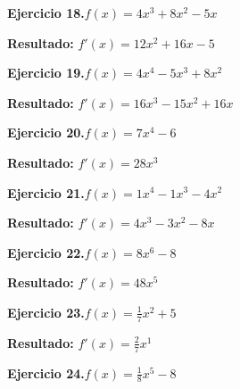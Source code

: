 \documentclass[10pt,a4paper]{article}
\begin{document}
\begin{ejbox}
\textbf{Ejercicio 18.}\quad $f(x) = 4x^3 +8x^2 -5x$
\end{ejbox}

\begin{solbox}
\textbf{Resultado:} \(\displaystyle f'(x) = 12x^2 +16x -5\)
\end{solbox}

\newpage
\begin{ejbox}
\textbf{Ejercicio 19.}\quad $f(x) = 4x^4 -5x^3 +8x^2$
\end{ejbox}

\begin{solbox}
\textbf{Resultado:} \(\displaystyle f'(x) = 16x^3 -15x^2 +16x\)
\end{solbox}

\begin{ejbox}
\textbf{Ejercicio 20.}\quad $f(x) = 7x^{4} -6$
\end{ejbox}

\begin{solbox}
\textbf{Resultado:} \(\displaystyle f'(x) = 28x^{3}\)
\end{solbox}

\begin{ejbox}
\textbf{Ejercicio 21.}\quad $f(x) = 1x^4 -1x^3 -4x^2$
\end{ejbox}

\begin{solbox}
\textbf{Resultado:} \(\displaystyle f'(x) = 4x^3 -3x^2 -8x\)
\end{solbox}

\newpage
\begin{ejbox}
\textbf{Ejercicio 22.}\quad $f(x) = 8x^{6} -8$
\end{ejbox}

\begin{solbox}
\textbf{Resultado:} \(\displaystyle f'(x) = 48x^{5}\)
\end{solbox}

\begin{ejbox}
\textbf{Ejercicio 23.}\quad $f(x) = \frac{1}{7}x^{2} +5$
\end{ejbox}

\begin{solbox}
\textbf{Resultado:} \(\displaystyle f'(x) = \frac{2}{7}x^{1}\)
\end{solbox}

\begin{ejbox}
\textbf{Ejercicio 24.}\quad $f(x) = \frac{1}{8}x^{5} -8$
\end{ejbox}
\end{document}
